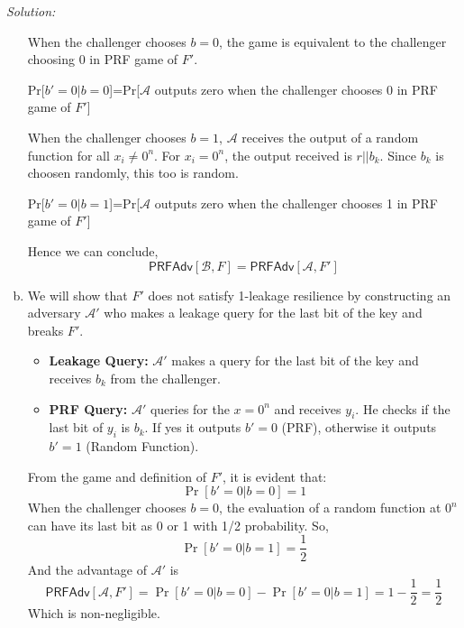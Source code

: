 \documentclass[a4paper, 11pt]{article}
\newenvironment{solution}
    {\textit{Solution:}}
    {\clearpage}
\newcommand{\prf}{\mathsf{PRFAdv}}
\newcommand{\calA}{\mathcal{A}}
\newcommand{\calB}{\mathcal{B}}
\begin{document}
\begin{solution}
\begin{enumerate}[(a)]
        When the challenger chooses $b=0$, the game is equivalent to the challenger choosing 0 in PRF game of $F'$. 
        \begin{center}
            Pr[$b'=0|b=0$]=Pr[$\calA$ outputs zero when the challenger chooses 0 in PRF game of $F'$]
        \end{center}
        When the challenger chooses $b=1$, $\calA$ receives the output of a random function for all $x_i\neq0^n$. For $x_i=0^n$, the output received is $r||b_k$. Since $b_k$ is choosen randomly, this too is random.
        \begin{center}
            Pr[$b'=0|b=1$]=Pr[$\calA$ outputs zero when the challenger chooses 1 in PRF game of $F'$]
        \end{center}
        Hence we can conclude,
        $$\prf[\calB,F]=\prf[\calA,F']$$

        \item We will show that $F'$ does not satisfy 1-leakage resilience by constructing an adversary $\calA'$ who makes a leakage query for the last bit of the key and breaks $F'$.
        \begin{itemize}
            \item \textbf{Leakage Query:} $\calA'$ makes a query for the last bit of the key and receives $b_k$ from the challenger.
            \item \textbf{PRF Query:} $\calA'$ queries for the $x=0^n$ and receives $y_i$. He checks if the last bit of $y_i$ is $b_k$. If yes it outputs $b'=0$ (PRF), otherwise it outputs $b'=1$ (Random Function). 
        \end{itemize}
        From the game and definition of $F'$, it is evident that:
        $$\Pr[b'=0|b=0]=1$$
        When the challenger chooses $b=0$, the evaluation of a random function at $0^n$ can have its last bit as 0 or 1 with 1/2 probability. So,
        $$\Pr[b'=0|b=1]=\frac12$$
        And the advantage of $\calA'$ is
        $$\prf[\calA,F']=\Pr[b'=0|b=0]-\Pr[b'=0|b=1]=1-\frac12=\frac12$$
        Which is non-negligible.
    \end{enumerate}
\end{solution}
\end{document}
